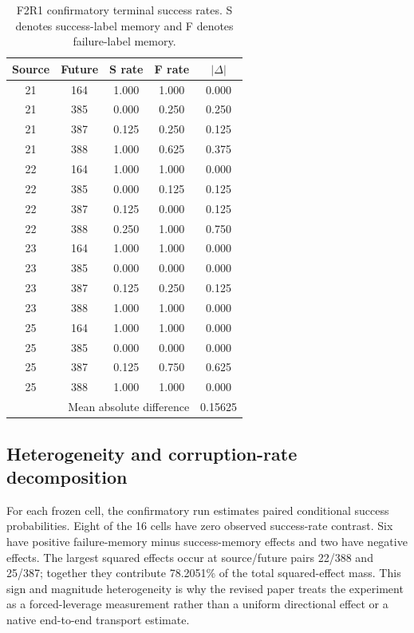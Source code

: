 \begin{table}[h]
\centering
\caption{F2R1 confirmatory terminal success rates. S denotes success-label memory and F denotes failure-label memory.}
\label{tab:f2r1-cells}
\scriptsize
\begin{tabular}{ccccc}
\toprule
Source & Future & S rate & F rate & $|\Delta|$ \\
\midrule
21 & 164 & 1.000 & 1.000 & 0.000 \\
21 & 385 & 0.000 & 0.250 & 0.250 \\
21 & 387 & 0.125 & 0.250 & 0.125 \\
21 & 388 & 1.000 & 0.625 & 0.375 \\
22 & 164 & 1.000 & 1.000 & 0.000 \\
22 & 385 & 0.000 & 0.125 & 0.125 \\
22 & 387 & 0.125 & 0.000 & 0.125 \\
22 & 388 & 0.250 & 1.000 & 0.750 \\
23 & 164 & 1.000 & 1.000 & 0.000 \\
23 & 385 & 0.000 & 0.000 & 0.000 \\
23 & 387 & 0.125 & 0.250 & 0.125 \\
23 & 388 & 1.000 & 1.000 & 0.000 \\
25 & 164 & 1.000 & 1.000 & 0.000 \\
25 & 385 & 0.000 & 0.000 & 0.000 \\
25 & 387 & 0.125 & 0.750 & 0.625 \\
25 & 388 & 1.000 & 1.000 & 0.000 \\
\midrule
\multicolumn{4}{r}{Mean absolute difference} & 0.15625 \\
\bottomrule
\end{tabular}
\end{table}

\subsection{Heterogeneity and corruption-rate decomposition}
For each frozen cell, the confirmatory run estimates paired conditional success probabilities. Eight of the 16 cells have zero observed success-rate contrast. Six have positive failure-memory minus success-memory effects and two have negative effects. The largest squared effects occur at source/future pairs 22/388 and 25/387; together they contribute 78.2051\% of the total squared-effect mass. This sign and magnitude heterogeneity is why the revised paper treats the experiment as a forced-leverage measurement rather than a uniform directional effect or a native end-to-end transport estimate.

